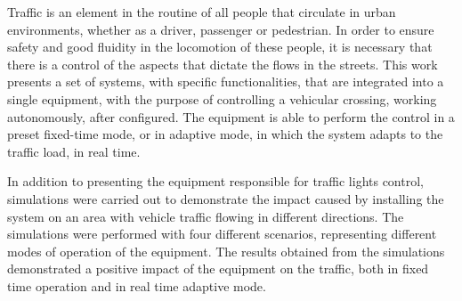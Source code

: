 Traffic is an element in the routine of all people that circulate in urban environments, whether as a driver, passenger or pedestrian. In order to ensure safety and good fluidity in the locomotion of these people, it is necessary that there is a control of the aspects that dictate the flows in the streets.
This work presents a set of systems, with specific functionalities, that are integrated into a single equipment, with the purpose of controlling a vehicular crossing, working autonomously, after configured. The equipment is able to perform the control in a preset fixed-time mode, or in adaptive mode, in which the system adapts to the traffic load, in real time.

In addition to presenting the equipment responsible for traffic lights control, simulations were carried out to demonstrate the impact caused by installing the system on an area with vehicle traffic flowing in different directions. The simulations were performed with four different scenarios, representing different modes of operation of the equipment.
The results obtained from the simulations demonstrated a positive impact of the equipment on the traffic, both in fixed time operation and in real time adaptive mode.
